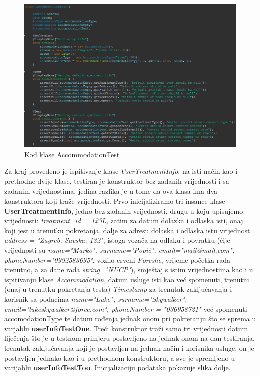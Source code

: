 			\begin{figure}[H]
				\includegraphics[width=\textwidth]{slike/AccommodationTest.JPG}
				\caption{Kod klase AccommodationTest}
				\label{AccommodationTest}
			\end{figure}
			
			Za kraj provedeno je ispitivanje klase \textit{UserTreatmentInfo}, na isti način kao i prethodne dvije klase, testiran je konstruktor bez zadanih vrijednosti i sa zadanim vrijednostima, jedina razlika je u tome da ova klasa ima dva konstruktora koji traže vrijednosti. Prvo inicijaliziramo tri insance klase \textbf{UserTreatmentInfo}, jedno bez zadanih vrijednosti, drugu u koju upisujemo vrijednosti: \textit{treatment\_id = 123L}, zatim za datum dolazka i odlaska isti, onaj koji jest u trenutku pokretanja, dalje za adresu dolaska i odlaska istu vrijednost \textit{address = "Zagreb, Savska, 132"}, istoga vozača na odlaku i povratku (čije vrijednosti su \textit{name="Marko", surname="Popić", email="mail@mail.com", phoneNumber="0992583695"}, vozilo crveni \textit{Porcshe}, vrijeme početka rada trenutno, a za dane rada \textit{string="NUCP"}), smještaj s istim vrijednostima kao i u ispitivanju klase \textit{Accommodation}, datum usluge isti kao već spomenuti, trenutni (onaj u trenutku pokretanja testa) \textit{Timestamp} za trenutak zaključavanja i korisnik sa podacima \textit{name="Luke", surname="Skywalker", email="lukeskywalker@force.com", phoneNumber = "036958721"} već spomenuti {accomodationType} te datum rođenja jednak onom pri pokretanju što se sprema u varjablu \textbf{userInfoTestOne}. Treći konstruktor traži samo tri vrijednosti datum liječenja što je u testnom primjeru postavljeno na jednak onom na dan testiranja, trenutak zaključavanja koji je postavljen na jednak način i korisnika usluge, on je postavljen jednako kao i u prethodnom konstruktoru, a sve je spremljeno u varijablu \textbf{userInfoTestToo}. Inicijalizaciju podataka pokazuje slika dolje.
			

